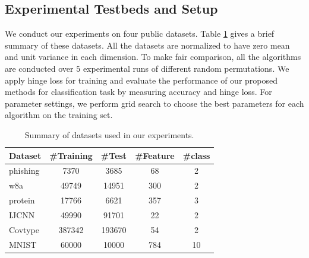 \documentclass[letterpaper]{article} %
\begin{document}
\subsection{Experimental Testbeds and Setup}
We conduct our experiments on four public datasets. Table \ref{tab0} gives a brief summary of these datasets. All the datasets are normalized to have zero mean and unit variance in each dimension. To make fair comparison, all the algorithms are conducted over $5$ experimental runs of different random permutations. We apply hinge loss for training and evaluate the performance of our proposed methods for classification task by measuring accuracy and hinge loss. For parameter settings, we perform grid search to choose the best parameters for each algorithm on the training set.
\begin{table}[htb]
	\centering
		\begin{tabular} {|l|c|c|c|c|}
			\hline
			Dataset & \#Training & \#Test & \#Feature   & \#class \\
			\hline
			phishing	& 7370		& 3685		& 68	& 2\\
			w8a			& 49749		& 14951		& 300	& 2\\
			protein		& 17766		& 6621		& 357	& 3\\
			IJCNN       & 49990     & 91701     & 22	& 2\\
			Covtype		& 387342	& 193670	& 54	& 2\\
			MNIST		& 60000		& 10000		& 784	& 10\\
			\hline
		\end{tabular}
	\caption{Summary of datasets used in our experiments.}
	\label{tab0}
\end{table}
\end{document}
